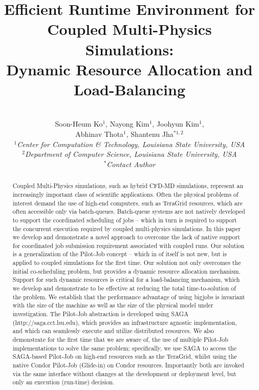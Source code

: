 \documentclass[conference,final]{IEEEtran}
\title{Efficient Runtime Environment for Coupled Multi-Physics Simulations: \\
Dynamic Resource Allocation and Load-Balancing}
\author{
 ~\\[-2em]
 Soon-Heum Ko$^{1}$, Nayong Kim$^{1}$, Joohyun Kim$^{1}$, \\ Abhinav Thota$^{1}$, Shantenu Jha$^{*1,2}$\\
 \small{\emph{$^{1}$Center for Computation \& Technology, Louisiana State University, USA}}\\
 \small{\emph{$^{2}$Department of Computer Science, Louisiana State University, USA}}\\
 \small{\emph{$^{*}$Contact Author}}\\
}
\newcommand{\up}{\vspace*{-1em}}
\begin{document}
\maketitle

\begin{abstract}
  Coupled Multi-Physics simulations, such as hybrid CFD-MD
  simulations, represent an increasingly important class of scientific
  applications.  Often the physical problems of interest demand the
  use of high-end computers, such as TeraGrid resources, which are
  often accessible only via batch-queues. Batch-queue systems are not
  natively developed to support the coordinated scheduling of jobs --
  which in turn is required to support the concurrent execution
  required by coupled multi-physics simulations. In this paper we
  develop and demonstrate a novel approach to overcome the lack of
  native support for coordinated job submission requirement associated
  with coupled runs. Our solution is a generalization of the Pilot-Job
  concept -- which in of itself is not new, but is applied to coupled
  simulations for the first time. Our solution not only overcomes the
  initial co-scheduling problem, but provides a dynamic resource
  allocation mechanism. Support for such dynamic resources is critical
  for a load-balancing mechanism, which we develop and demonstrate to
  be effective at reducing the total time-to-solution of the
  problem. We establish that the performance advantage of using
  bigjobs is invariant with the size of the machine as well as the
  size of the physical model under investigation.  The Pilot-Job
  abstraction is developed using SAGA (http://saga.cct.lsu.edu), which
  provides an infrastructure agnostic implementation, and which can
  seamlessly execute and utilize distributed resources. We also
  demonstrate for the first time that we are aware of, the use of
  multiple Pilot-Job implementations to solve the same problem;
  specifically, we use SAGA to access the SAGA-based Pilot-Job on
  high-end resources such as the TeraGrid, whilst using the native
  Condor Pilot-Job (Glide-in) on Condor resources. Importantly both
  are invoked via the same interface without changes at the
  development or deployment level, but only an execution (run-time)
  decision.
\end{abstract}
\up\up
\end{document}
